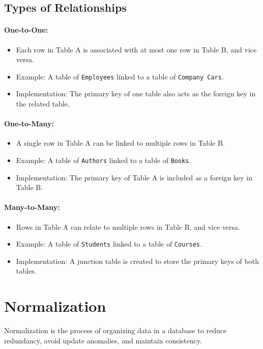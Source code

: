 \documentclass{article}
\begin{document}
\subsection{Types of Relationships}
\paragraph{One-to-One:}
\begin{itemize}
    \item Each row in Table A is associated with at most one row in Table B, and vice versa.
    \item Example: A table of \texttt{Employees} linked to a table of \texttt{Company Cars}.
    \item Implementation: The primary key of one table also acts as the foreign key in the related table.
\end{itemize}

\paragraph{One-to-Many:}
\begin{itemize}
    \item A single row in Table A can be linked to multiple rows in Table B.
    \item Example: A table of \texttt{Authors} linked to a table of \texttt{Books}.
    \item Implementation: The primary key of Table A is included as a foreign key in Table B.
\end{itemize}

\paragraph{Many-to-Many:}
\begin{itemize}
    \item Rows in Table A can relate to multiple rows in Table B, and vice versa.
    \item Example: A table of \texttt{Students} linked to a table of \texttt{Courses}.
    \item Implementation: A junction table is created to store the primary keys of both tables.
\end{itemize}

\section{Normalization}
Normalization is the process of organizing data in a database to reduce redundancy, avoid update anomalies, and maintain consistency.
\end{document}

